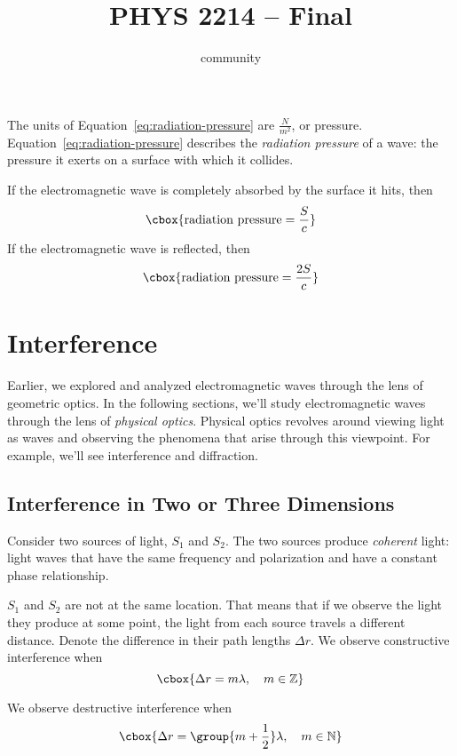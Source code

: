 \documentclass{hw} \title{PHYS 2214 -- Final} \author{community}
\numberwithin{equation}{section}
\begin{document}
The units of Equation~\ref{eq:radiation-pressure} are $\frac{N}{m^2}$, or
pressure. Equation~\ref{eq:radiation-pressure} describes the \emph{radiation
pressure} of a wave: the pressure it exerts on a surface with which it
collides.

If the electromagnetic wave is completely absorbed by the surface it hits, then
\begin{equation} \cbox{\text{radiation pressure} = \frac{S}{c}} \end{equation}
If the electromagnetic wave is reflected, then \begin{equation}
  \cbox{\text{radiation pressure} = \frac{2S}{c}} \end{equation}

\section{Interference}\label{sec:interference} Earlier, we explored and
analyzed electromagnetic waves through the lens of geometric optics. In the
following sections, we'll study electromagnetic waves through the lens of
\emph{physical optics}. Physical optics revolves around viewing light as waves
and observing the phenomena that arise through this viewpoint. For example,
we'll see interference and diffraction.

\subsection{Interference in Two or Three Dimensions} Consider two sources of
light, $S_1$ and $S_2$. The two sources produce \emph{coherent} light: light
waves that have the same frequency and polarization and have a constant phase
relationship. 

$S_1$ and $S_2$ are not at the same location. That means that if we observe the
light they produce at some point, the light from each source travels a
different distance. Denote the difference in their path lengths $\Delta r$. We
observe constructive interference when \begin{equation}\label{eq:constructive}
  \cbox{\Delta r = m \lambda, \quad m \in \mathbb{Z}} \end{equation}

We observe destructive interference when \begin{equation}\label{eq:destructive}
  \cbox{\Delta r = \group{m + \frac{1}{2}} \lambda, \quad m \in \mathbb{N}}
\end{equation}
\end{document}
